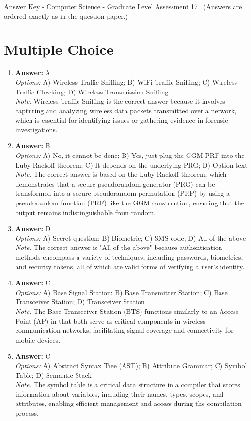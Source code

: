 \documentclass[12pt]{article}
\begin{document}
\begin{center}
Answer Key - Computer Science - Graduate Level Assessment 17 \
\small (Answers are ordered exactly as in the question paper.)
\end{center}

\section*{Multiple Choice}
\begin{enumerate}[label=\arabic*.]
\item \textbf{Answer:} A
\\ \textit{Options:} A) Wireless Traffic Sniffing; B) WiFi Traffic Sniffing; C) Wireless Traffic Checking; D) Wireless Transmission Sniffing
\\ \textit{Note:} Wireless Traffic Sniffing is the correct answer because it involves capturing and analyzing wireless data packets transmitted over a network, which is essential for identifying issues or gathering evidence in forensic investigations.
\item \textbf{Answer:} B
\\ \textit{Options:} A) No, it cannot be done; B) Yes, just plug the GGM PRF into the Luby-Rackoff theorem; C) It depends on the underlying PRG; D) Option text
\\ \textit{Note:} The correct answer is based on the Luby-Rackoff theorem, which demonstrates that a secure pseudorandom generator (PRG) can be transformed into a secure pseudorandom permutation (PRP) by using a pseudorandom function (PRF) like the GGM construction, ensuring that the output remains indistinguishable from random.
\item \textbf{Answer:} D
\\ \textit{Options:} A) Secret question; B) Biometric; C) SMS code; D) All of the above
\\ \textit{Note:} The correct answer is "All of the above" because authentication methods encompass a variety of techniques, including passwords, biometrics, and security tokens, all of which are valid forms of verifying a user's identity.
\item \textbf{Answer:} C
\\ \textit{Options:} A) Base Signal Station; B) Base Transmitter Station; C) Base Transceiver Station; D) Transceiver Station
\\ \textit{Note:} The Base Transceiver Station (BTS) functions similarly to an Access Point (AP) in that both serve as critical components in wireless communication networks, facilitating signal coverage and connectivity for mobile devices.
\item \textbf{Answer:} C
\\ \textit{Options:} A) Abstract Syntax Tree (AST); B) Attribute Grammar; C) Symbol Table; D) Semantic Stack
\\ \textit{Note:} The symbol table is a critical data structure in a compiler that stores information about variables, including their names, types, scopes, and attributes, enabling efficient management and access during the compilation process.
\end{enumerate}
\end{document}

